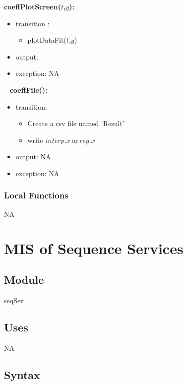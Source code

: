 \documentclass[12pt, titlepage]{article}
\begin{document}
\noindent \textbf{coeffPlotScreen($t$,$y$):}
\begin{itemize}
	\item transition :
	\begin{itemize}
		\item plotDataFit($t$,$y$)
	\end{itemize}
	\item output:  
	\item exception: NA
\end{itemize}


~\newline
\noindent \textbf{coeffFile():}
\begin{itemize}
	\item transition: 
	\begin{itemize}
		
		\item Create a csv file named `Result'
		\item write $interp.x\ \text{or}\ reg.x$
	\end{itemize}
	\item output: NA
	\item exception: NA 
\end{itemize}

\subsubsection{Local Functions}

NA



\section{MIS of Sequence Services} \label{seqSer} 

\subsection{Module}

seqSer 

\subsection{Uses} 
NA
\subsection{Syntax}
\end{document}
